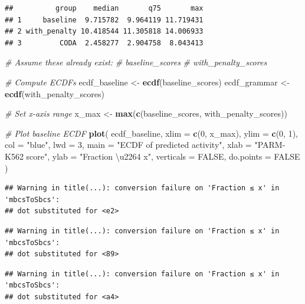 \documentclass[
]{article}
\newenvironment{Shaded}{\begin{snugshade}}{\end{snugshade}}
\newcommand{\AttributeTok}[1]{\textcolor[rgb]{0.13,0.29,0.53}{#1}}
\newcommand{\CommentTok}[1]{\textcolor[rgb]{0.56,0.35,0.01}{\textit{#1}}}
\newcommand{\ConstantTok}[1]{\textcolor[rgb]{0.56,0.35,0.01}{#1}}
\newcommand{\DecValTok}[1]{\textcolor[rgb]{0.00,0.00,0.81}{#1}}
\newcommand{\FunctionTok}[1]{\textcolor[rgb]{0.13,0.29,0.53}{\textbf{#1}}}
\newcommand{\NormalTok}[1]{#1}
\newcommand{\OtherTok}[1]{\textcolor[rgb]{0.56,0.35,0.01}{#1}}
\newcommand{\StringTok}[1]{\textcolor[rgb]{0.31,0.60,0.02}{#1}}
\begin{document}
\begin{verbatim}
##          group    median       q75       max
## 1     baseline  9.715782  9.964119 11.719431
## 2 with_penalty 10.418544 11.305818 14.006933
## 3         CODA  2.458277  2.904758  8.043413
\end{verbatim}

\begin{Shaded}
\begin{Highlighting}[]
\CommentTok{\# Assume these already exist:}
\CommentTok{\# baseline\_scores}
\CommentTok{\# with\_penalty\_scores}

\CommentTok{\# Compute ECDFs}
\NormalTok{ecdf\_baseline }\OtherTok{\textless{}{-}} \FunctionTok{ecdf}\NormalTok{(baseline\_scores)}
\NormalTok{ecdf\_grammar  }\OtherTok{\textless{}{-}} \FunctionTok{ecdf}\NormalTok{(with\_penalty\_scores)}

\CommentTok{\# Set x{-}axis range}
\NormalTok{x\_max }\OtherTok{\textless{}{-}} \FunctionTok{max}\NormalTok{(}\FunctionTok{c}\NormalTok{(baseline\_scores, with\_penalty\_scores))}

\CommentTok{\# Plot baseline ECDF}
\FunctionTok{plot}\NormalTok{(}
\NormalTok{  ecdf\_baseline,}
  \AttributeTok{xlim =} \FunctionTok{c}\NormalTok{(}\DecValTok{0}\NormalTok{, x\_max),}
  \AttributeTok{ylim =} \FunctionTok{c}\NormalTok{(}\DecValTok{0}\NormalTok{, }\DecValTok{1}\NormalTok{),}
  \AttributeTok{col =} \StringTok{"blue"}\NormalTok{,}
  \AttributeTok{lwd =} \DecValTok{3}\NormalTok{,}
  \AttributeTok{main =} \StringTok{"ECDF of predicted activity"}\NormalTok{,}
  \AttributeTok{xlab =} \StringTok{"PARM{-}K562 score"}\NormalTok{,}
  \AttributeTok{ylab =} \StringTok{"Fraction \textbackslash{}u2264 x"}\NormalTok{,}
  \AttributeTok{verticals =} \ConstantTok{FALSE}\NormalTok{,}
  \AttributeTok{do.points =} \ConstantTok{FALSE}
\NormalTok{)}
\end{Highlighting}
\end{Shaded}

\begin{verbatim}
## Warning in title(...): conversion failure on 'Fraction ≤ x' in 'mbcsToSbcs':
## dot substituted for <e2>
\end{verbatim}

\begin{verbatim}
## Warning in title(...): conversion failure on 'Fraction ≤ x' in 'mbcsToSbcs':
## dot substituted for <89>
\end{verbatim}

\begin{verbatim}
## Warning in title(...): conversion failure on 'Fraction ≤ x' in 'mbcsToSbcs':
## dot substituted for <a4>
\end{verbatim}
\end{document}
